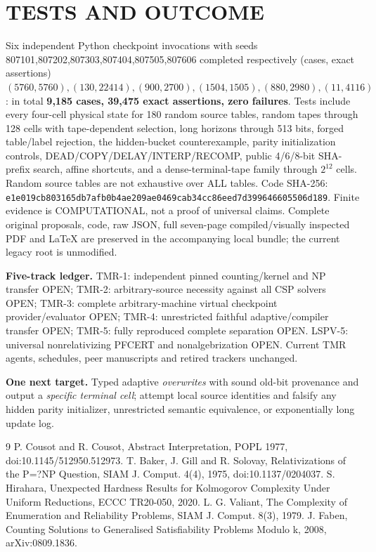 \documentclass[11pt]{article}
\begin{document}
\section{TESTS AND OUTCOME}
Six independent Python checkpoint invocations with seeds 807101,807202,807303,807404,807505,807606 completed respectively (cases, exact assertions) $(5760,5760),(130,22414),(900,2700),(1504,1505),(880,2980),(11,4116)$: in total \textbf{9,185 cases, 39,475 exact assertions, zero failures}. Tests include every four-cell physical state for 180 random source tables, random tapes through 128 cells with tape-dependent selection, long horizons through 513 bits, forged table/label rejection, the hidden-bucket counterexample, parity initialization controls, DEAD/COPY/DELAY/INTERP/RECOMP, public 4/6/8-bit SHA-prefix search, affine shortcuts, and a dense-terminal-tape family through $2^{12}$ cells. Random source tables are not exhaustive over ALL tables. Code SHA-256: \texttt{e1e019cb803165db7afb0b4ae209ae0469cab34cc86eed7d399646605506d189}. Finite evidence is COMPUTATIONAL, not a proof of universal claims. Complete original proposals, code, raw JSON, full seven-page compiled/visually inspected PDF and LaTeX are preserved in the accompanying local bundle; the current legacy root is unmodified.

\noindent\textbf{Five-track ledger.} TMR-1: independent pinned counting/kernel and NP transfer OPEN; TMR-2: arbitrary-source necessity against all CSP solvers OPEN; TMR-3: complete arbitrary-machine virtual checkpoint provider/evaluator OPEN; TMR-4: unrestricted faithful adaptive/compiler transfer OPEN; TMR-5: fully reproduced complete separation OPEN. LSPV-5: universal nonrelativizing PFCERT and nonalgebrization OPEN. Current TMR agents, schedules, peer manuscripts and retired trackers unchanged.

\noindent\textbf{One next target.} Typed adaptive \emph{overwrites} with sound old-bit provenance and output a \emph{specific terminal cell}; attempt local source identities and falsify any hidden parity initializer, unrestricted semantic equivalence, or exponentially long update log.

\begin{thebibliography}{9}
 P. Cousot and R. Cousot, Abstract Interpretation, POPL 1977, doi:10.1145/512950.512973.
 T. Baker, J. Gill and R. Solovay, Relativizations of the P=?NP Question, SIAM J. Comput. 4(4), 1975, doi:10.1137/0204037.
 S. Hirahara, Unexpected Hardness Results for Kolmogorov Complexity Under Uniform Reductions, ECCC TR20-050, 2020.
 L. G. Valiant, The Complexity of Enumeration and Reliability Problems, SIAM J. Comput. 8(3), 1979.
 J. Faben, Counting Solutions to Generalised Satisfiability Problems Modulo k, 2008, arXiv:0809.1836.
\end{thebibliography}
\end{document}
